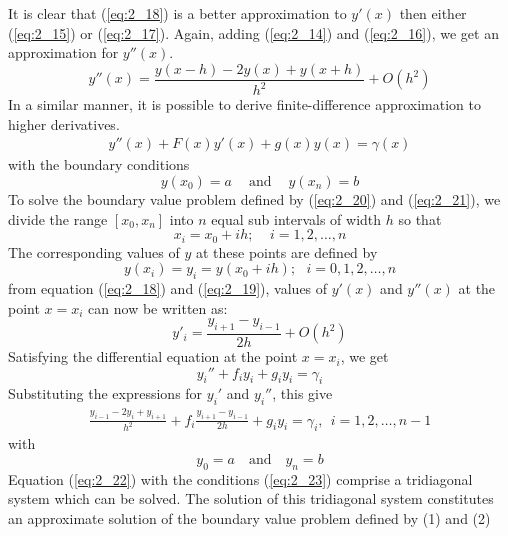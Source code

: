 \documentclass[12pt]{report}
\newcommand{\refn}[1]{(\ref{#1})}
\newcommand{\refx}[1]{\refn{eq:#1}}
\newcommand{\NI}{\noindent}
\newcommand{\sprime}{'}
\newcommand{\dprime}{''}
\begin{document}
	 
	\NI It is clear that \refx{2_18} is a better approximation to $y\sprime(x)$ then either \refx{2_15} or \refx{2_17}. Again, adding \refx{2_14} and \refx{2_16}, we get an approximation for $y\dprime(x)$.
	\begin{equation}
		y\dprime(x) = \frac{y(x-h) - 2y(x) + y(x+h)}{h^2} + O(h^2) \label{eq:2_19}
	\end{equation}
	In a similar manner, it is possible to derive finite-difference approximation to higher derivatives.
	\begin{eqnarray}
		y\dprime(x) + F(x)y\sprime(x) + g(x)y(x) = \gamma(x) \label{eq:2_20}
	\end{eqnarray}
	with the boundary conditions
	\begin{equation}
		y(x_0)=a ~~~~\text{ and }~~~~ y(x_n) = b \label{eq:2_21}
	\end{equation}
	To solve the boundary value problem defined by \refx{2_20} and \refx{2_21}, we divide the range $[x_0, x_n]$ into $n$ equal sub intervals of width $h$ so that
	$$
		x_i = x_0 + ih; ~~~~~ i=1,2,\ldots, n
	$$
	The corresponding values of $y$ at these points are defined by
	$$
		y(x_i) = y_i = y(x_0 + ih); ~~~ i=0,1,2,\ldots, n
	$$
	from equation \refx{2_18} and \refx{2_19}, values of $y\sprime(x)$ and $y\dprime(x)$ at the point $x=x_i$ can now be written as:
	$$
		y\sprime_i = \frac{y_{i+1} - y_{i-1}}{2h} + O(h^2)
	$$
	Satisfying the differential equation at the point $x=x_i$, we get
	\begin{equation*}
		y_i\dprime + f_iy_i + g_iy_i = \gamma_i
	\end{equation*}
	Substituting the expressions for $y_i\sprime$ and $y_i\dprime$, this give 
	\begin{eqnarray}
		\frac{y_{i-1} - 2y_i + y_{i+1}}{h^2} + f_i\frac{y_{i+1} - y_{i-1}}{2h} + g_iy_i = \gamma_i, ~~i=1,2,\ldots, n-1\label{eq:2_22}
	\end{eqnarray}
	with 
	\begin{equation}
		y_0=a ~~~\text{ and }~~~ y_n=b \label{eq:2_23}
	\end{equation}
	Equation \refx{2_22} with the conditions \refx{2_23} comprise a tridiagonal system which can be solved. The solution of this tridiagonal system constitutes an approximate solution of the boundary value problem defined by (1) and (2)
	
\end{document}
